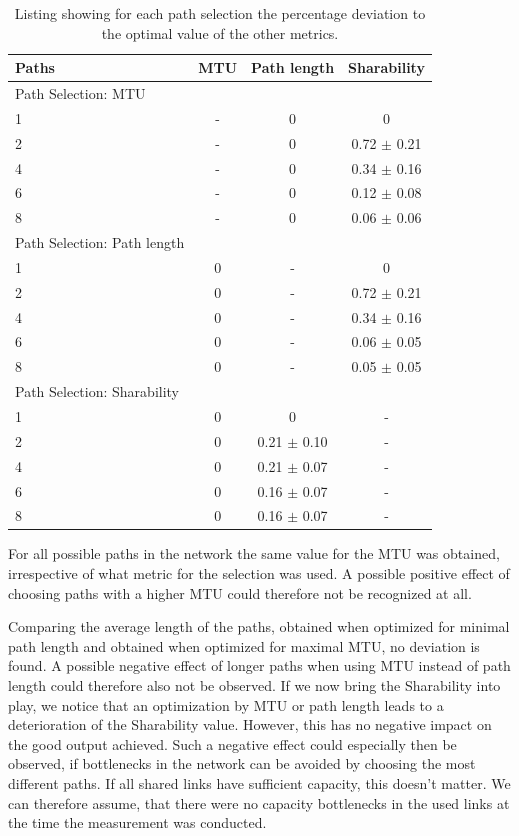 \begin{table}
	\begin{center}
		\begin{tabular}{lccc}\toprule
			   			Paths & MTU & Path length & Sharability \\\midrule
			
			{\footnotesize Path Selection: }MTU			& & & \\
			1  	& - & 0 & 0    \\
			2  	& - & 0 & 0.72 {\small $\pm$ 0.21}  \\
			4  	& - & 0 & 0.34 {\small $\pm$ 0.16} \\
			6  	& - & 0 & 0.12 {\small $\pm$ 0.08} \\
			8  	& - & 0 & 0.06 {\small $\pm$ 0.06} \smallskip\\
			{\footnotesize Path Selection: }Path length  	& & & \\
			1  	& 0 & - & 0    \\
			2  	& 0 & - & 0.72 {\small $\pm$ 0.21} \\
			4  	& 0 & - & 0.34 {\small $\pm$ 0.16} \\
			6  	& 0 & - & 0.06 {\small $\pm$ 0.05} \\
			8 		& 0 & - & 0.05 {\small $\pm$ 0.05} \smallskip\\
			{\footnotesize Path Selection: }Sharability		& & & \\
			1  	& 0 & 0    & - \\
			2 	& 0 & 0.21 {\small $\pm$ 0.10}  & - \\
			4  	& 0 & 0.21 {\small $\pm$ 0.07} & - \\
			6  	& 0 & 0.16 {\small $\pm$ 0.07} & - \\
			8  	& 0 & 0.16 {\small $\pm$  0.07} & - \\\bottomrule
		\end{tabular}
		\caption{Listing showing for each path selection the percentage deviation to the optimal value of the other metrics.}
		\label{tab:DiffFromOptimal}
	\end{center}
\end{table}

For all possible paths in the network the same value for the MTU was obtained, irrespective of what metric for the selection was used. A possible positive effect of choosing paths with a higher MTU could therefore not be recognized at all. 

Comparing the average length of the paths, obtained when optimized for minimal path length and obtained when optimized for maximal MTU, no deviation is found. A possible negative effect of longer paths when using MTU instead of path length could therefore also not be observed. If we now bring the Sharability into play, we notice that an optimization by MTU or path length leads to a deterioration of the Sharability value. However, this has no negative impact on the good output achieved. Such a negative effect could especially then be observed,  if bottlenecks in the network can be avoided by choosing the most different paths. If all shared links have sufficient capacity, this doesn't matter. We can therefore assume, that there were no capacity bottlenecks in the used links at the time the measurement was conducted. 

